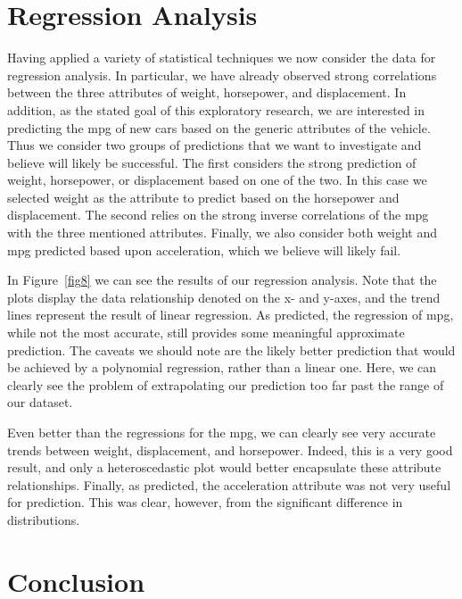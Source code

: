 \documentclass[10pt, conference, compsocconf]{IEEEtran}
\begin{document}
\section{Regression Analysis}\label{regression}

Having applied a variety of statistical techniques we now consider the data for regression analysis. In particular, we have already observed strong correlations between the three attributes of weight, horsepower, and displacement. In addition, as the stated goal of this exploratory research, we are interested in predicting the mpg of new cars based on the generic attributes of the vehicle. Thus we consider two groups of predictions that we want to investigate and believe will likely be successful. The first considers the strong prediction of weight, horsepower, or displacement based on one of the two. In this case we selected weight as the attribute to predict based on the horsepower and displacement. The second relies on the strong inverse correlations of the mpg with the three mentioned attributes. Finally, we also consider both weight and mpg predicted based upon acceleration, which we believe will likely fail. 

In Figure~\ref{fig8} we can see the results of our regression analysis. Note that the plots display the data relationship denoted on the x- and y-axes, and the trend lines represent the result of linear regression. As predicted, the regression of mpg, while not the most accurate, still provides some meaningful approximate prediction. The caveats we should note are the likely better prediction that would be achieved by a polynomial regression, rather than a linear one. Here, we can clearly see the problem of extrapolating our prediction too far past the range of our dataset. 

Even better than the regressions for the mpg, we can clearly see very accurate trends between weight, displacement, and horsepower. Indeed, this is a very good result, and only a heteroscedastic plot would better encapsulate these attribute relationships. Finally, as predicted, the acceleration attribute was not very useful for prediction. This was clear, however, from the significant difference in distributions. 

\vspace{-0.01cm}
\section{Conclusion}\label{conclusion}
\vspace{-0.01cm}
\end{document}
